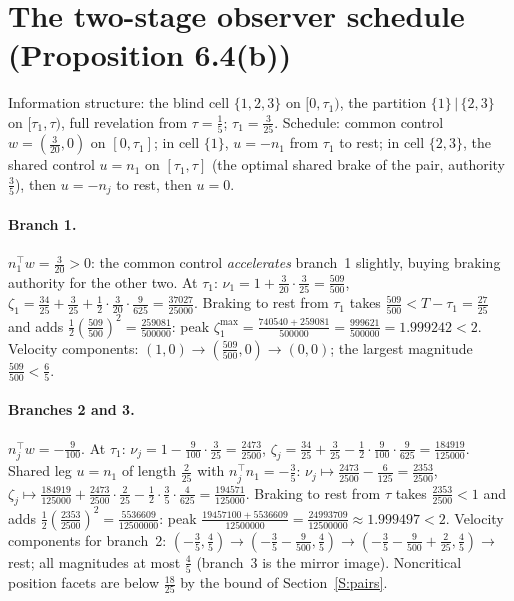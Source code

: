 \documentclass[11pt,a4paper]{article}
\theoremstyle{plain}
\theoremstyle{definition}
\theoremstyle{remark}
\newcommand{\tfr}[2]{\tfrac{#1}{#2}}
\begin{document}
\section{The two-stage observer schedule (Proposition 6.4(b))}\label{S:observer}

Information structure: the blind cell $\{1,2,3\}$ on $[0,\tau_1)$, the partition $\{1\}\,|\,\{2,3\}$ on $[\tau_1,\tau)$, full revelation from $\tau=\tfr15$; $\tau_1=\tfr3{25}$. Schedule: common control $w=(\tfr3{20},0)$ on $[0,\tau_1]$; in cell $\{1\}$, $u=-n_1$ from $\tau_1$ to rest; in cell $\{2,3\}$, the shared control $u=n_1$ on $[\tau_1,\tau]$ (the optimal shared brake of the pair, authority $\tfr35$), then $u=-n_j$ to rest, then $u=0$.

\paragraph{Branch 1.}
$n_1^\top w=\tfr3{20}>0$: the common control \emph{accelerates} branch~1 slightly, buying braking authority for the other two. At $\tau_1$: $\nu_1=1+\tfr3{20}\cdot\tfr3{25}=\tfr{509}{500}$, $\zeta_1=\tfr{34}{25}+\tfr3{25}+\tfrac12\cdot\tfr3{20}\cdot\tfr9{625}=\tfr{37027}{25000}$. Braking to rest from $\tau_1$ takes $\tfr{509}{500}<T-\tau_1=\tfr{27}{25}$ and adds $\tfrac12(\tfr{509}{500})^2=\tfr{259081}{500000}$: peak $\zeta_1^{\max}=\tfr{740540+259081}{500000}=\tfr{999621}{500000}=1.999242<2$. Velocity components: $(1,0)\to(\tfr{509}{500},0)\to(0,0)$; the largest magnitude $\tfr{509}{500}<\tfr65$.

\paragraph{Branches 2 and 3.}
$n_j^\top w=-\tfr9{100}$. At $\tau_1$: $\nu_j=1-\tfr9{100}\cdot\tfr3{25}=\tfr{2473}{2500}$, $\zeta_j=\tfr{34}{25}+\tfr3{25}-\tfrac12\cdot\tfr9{100}\cdot\tfr9{625}=\tfr{184919}{125000}$. Shared leg $u=n_1$ of length $\tfr2{25}$ with $n_j^\top n_1=-\tfr35$: $\nu_j\mapsto\tfr{2473}{2500}-\tfr6{125}=\tfr{2353}{2500}$, $\zeta_j\mapsto\tfr{184919}{125000}+\tfr{2473}{2500}\cdot\tfr2{25}-\tfrac12\cdot\tfr35\cdot\tfr4{625}=\tfr{194571}{125000}$. Braking to rest from $\tau$ takes $\tfr{2353}{2500}<1$ and adds $\tfrac12(\tfr{2353}{2500})^2=\tfr{5536609}{12500000}$: peak $\tfr{19457100+5536609}{12500000}=\tfr{24993709}{12500000}\approx1.999497<2$. Velocity components for branch~2: $(-\tfr35,\tfr45)\to(-\tfr35-\tfr9{500},\tfr45)\to(-\tfr35-\tfr9{500}+\tfr2{25},\tfr45)\to$ rest; all magnitudes at most $\tfr45$ (branch~3 is the mirror image). Noncritical position facets are below $\tfr{18}{25}$ by the bound of Section~\ref{S:pairs}.
\end{document}
